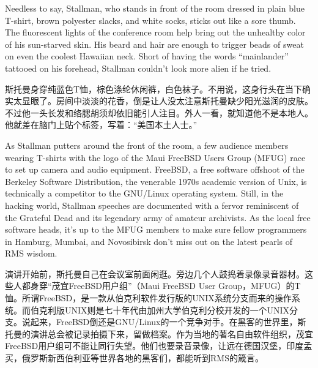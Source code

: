 \ifdefined\eng
Needless to say, Stallman, who stands in front of the room dressed in plain blue T-shirt, brown polyester slacks, and white socks, sticks out like a sore thumb. The fluorescent lights of the conference room help bring out the unhealthy color of his sun-starved skin.\ifdefined\vtwo {} \fi His beard and hair are enough to trigger beads of sweat on even the coolest Hawaiian neck. Short of having the words ``mainlander'' tattooed on his forehead, Stallman couldn't look more alien if he tried. \ifdefined{}\fi
\fi

\ifdefined\chs
斯托曼身穿纯蓝色T恤，棕色涤纶休闲裤，白色袜子。不用说，这身行头在当下确实太显眼了。房间中淡淡的花香，倒是让人没太注意斯托曼缺少阳光滋润的皮肤\ifdefined\vtwo {}\fi。不过他一头长发和络腮胡须却依旧能引人注目。外人一看，就知道他不是本地人。他就差在脑门上贴个标签，写着：``美国本土人士。''\ifdefined{}\fi
\fi

\ifdefined\eng
As Stallman putters around the front of the room, a few audience members wearing T-shirts with the logo of the Maui FreeBSD Users Group (MFUG) race to set up camera and audio equipment. FreeBSD, a free software offshoot of the Berkeley Software Distribution, the venerable 1970s academic version of Unix, is technically a competitor to the GNU/Linux operating system. Still, in the hacking world, Stallman speeches are documented with a fervor reminiscent of the Grateful Dead and its legendary army of amateur archivists. As the local free software heads, it's up to the MFUG members to make sure fellow programmers in Hamburg, Mumbai, and Novosibirsk don't miss out on the latest pearls of RMS wisdom.
\fi

\ifdefined\chs
演讲开始前，斯托曼自己在会议室前面闲逛。旁边几个人鼓捣着录像录音器材。这些人都身穿``茂宜FreeBSD用户组''（Maui FreeBSD User Group，MFUG）的T恤。所谓FreeBSD，是一款从伯克利软件发行版的UNIX系统分支而来的操作系统。而伯克利版UNIX则是七十年代由加州大学伯克利分校开发的一个UNIX分支。说起来，FreeBSD倒还是GNU/Linux的一个竞争对手。在黑客的世界里，斯托曼的演讲总会被记录拍摄下来，留做档案。作为当地的著名自由软件组织，茂宜FreeBSD用户组可不能让同行失望。他们也要录音录像，让远在德国汉堡，印度孟买，俄罗斯新西伯利亚等世界各地的黑客们，都能听到RMS的箴言。
\fi

